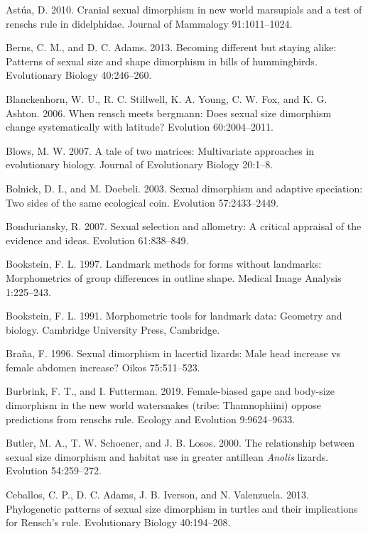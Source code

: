 \documentclass[]{article}
\begin{document}
\hypertarget{ref-Astua2010}{}
Astúa, D. 2010. Cranial sexual dimorphism in new world marsupials and a
test of renschs rule in didelphidae. Journal of Mammalogy 91:1011--1024.

\hypertarget{ref-Berns2013}{}
Berns, C. M., and D. C. Adams. 2013. Becoming different but staying
alike: Patterns of sexual size and shape dimorphism in bills of
hummingbirds. Evolutionary Biology 40:246--260.

\hypertarget{ref-Blanckenhorn2006}{}
Blanckenhorn, W. U., R. C. Stillwell, K. A. Young, C. W. Fox, and K. G.
Ashton. 2006. When rensch meets bergmann: Does sexual size dimorphism
change systematically with latitude? Evolution 60:2004--2011.

\hypertarget{ref-Blows2007}{}
Blows, M. W. 2007. A tale of two matrices: Multivariate approaches in
evolutionary biology. Journal of Evolutionary Biology 20:1--8.

\hypertarget{ref-Bolnick2003}{}
Bolnick, D. I., and M. Doebeli. 2003. Sexual dimorphism and adaptive
speciation: Two sides of the same ecological coin. Evolution
57:2433--2449.

\hypertarget{ref-Bonduriansky2007}{}
Bonduriansky, R. 2007. Sexual selection and allometry: A critical
appraisal of the evidence and ideas. Evolution 61:838--849.

\hypertarget{ref-Bookstein1997}{}
Bookstein, F. L. 1997. Landmark methods for forms without landmarks:
Morphometrics of group differences in outline shape. Medical Image
Analysis 1:225--243.

\hypertarget{ref-Bookstein1991}{}
Bookstein, F. L. 1991. Morphometric tools for landmark data: Geometry
and biology. Cambridge University Press, Cambridge.

\hypertarget{ref-Brana1996}{}
Braña, F. 1996. Sexual dimorphism in lacertid lizards: Male head
increase vs female abdomen increase? Oikos 75:511--523.

\hypertarget{ref-Burbrink2019}{}
Burbrink, F. T., and I. Futterman. 2019. Female-biased gape and
body-size dimorphism in the new world watersnakes (tribe: Thamnophiini)
oppose predictions from renschs rule. Ecology and Evolution
9:9624--9633.

\hypertarget{ref-Butler_et_al2000}{}
Butler, M. A., T. W. Schoener, and J. B. Losos. 2000. The relationship
between sexual size dimorphism and habitat use in greater antillean
\emph{Anolis} lizards. Evolution 54:259--272.

\hypertarget{ref-Ceballos2013}{}
Ceballos, C. P., D. C. Adams, J. B. Iverson, and N. Valenzuela. 2013.
Phylogenetic patterns of sexual size dimorphism in turtles and their
implications for Rensch's rule. Evolutionary Biology 40:194--208.
\end{document}
